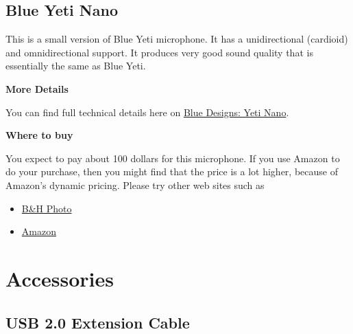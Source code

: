 \subsection{Blue Yeti Nano}
\label{sec:equipment::blueyetinano}

\begin{gram}
\label{grm:equipment::blueyetinano::main}
%
This is a small version of Blue Yeti microphone.
%
It has a unidirectional (cardioid) and omnidirectional support.
%
It produces very good sound quality that is essentially the same as Blue Yeti.


\textbf{More Details}

You can find full technical details here on \href{https://www.bluedesigns.com/products/yeti-nano/}{Blue Designs: Yeti Nano}.


\textbf{Where to buy}

You expect to pay about 100 dollars for this microphone.  If you use Amazon to do your purchase, then you might find that the price is a lot higher, because of Amazon's dynamic pricing.  Please try other web sites such as 

\begin{itemize}
\item
\href{https://www.bhphotovideo.com/c/l-search?q=Blue%20Yeti%20Nano&N=0}{B\&H Photo}
\item 
\href{https://www.amazon.com/Blue-Yeti-Premium-Recording-Streaming/dp/B07DTTGZ7M}{Amazon}
\end{itemize}
\end{gram}

\begin{gram}
\end{gram}

\section{Accessories}
\label{sec:equipment::accessories}

\subsection{USB 2.0 Extension Cable}
\label{sec:equipment::accessories::usbextend}

